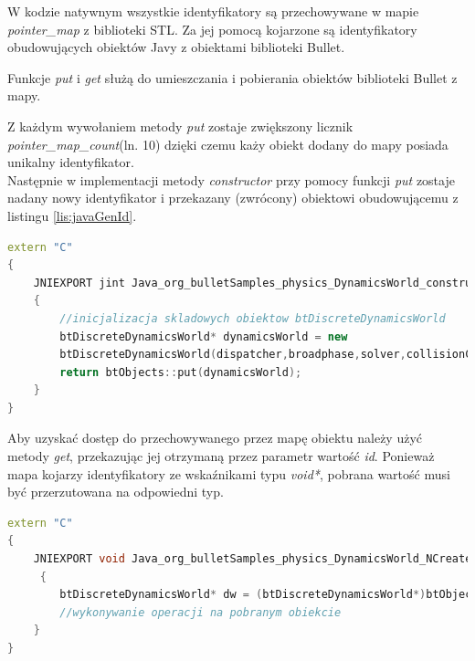 

W kodzie natywnym wszystkie identyfikatory są przechowywane w mapie
\emph{pointer\_map} z biblioteki STL. Za jej pomocą kojarzone są identyfikatory
obudowujących obiektów Javy z obiektami biblioteki Bullet.

\newpage


Funkcje \emph{put} i \emph{get} służą do umieszczania i pobierania obiektów
biblioteki Bullet z mapy.



Z każdym wywołaniem metody \emph{put} zostaje zwiększony licznik
\emph{pointer\_map\_count}(ln. 10) dzięki czemu każy obiekt dodany do mapy
posiada unikalny identyfikator.\\
Następnie w implementacji metody \emph{constructor} przy
pomocy funkcji \emph{put} zostaje nadany nowy identyfikator i
przekazany (zwrócony) obiektowi obudowującemu z listingu \ref{lis:javaGenId}.

\begin{lstlisting}[language=c++, caption=Użycie mapy pointer\_map w
funkcji constructor.]
extern "C"
{
	JNIEXPORT jint Java_org_bulletSamples_physics_DynamicsWorld_constructor( JNIEnv* env, jobject self )
	{
		//inicjalizacja skladowych obiektow btDiscreteDynamicsWorld
		btDiscreteDynamicsWorld* dynamicsWorld = new
		btDiscreteDynamicsWorld(dispatcher,broadphase,solver,collisionConfiguration);
		return btObjects::put(dynamicsWorld);
	}
}
\end{lstlisting}

Aby uzyskać dostęp do przechowywanego przez mapę obiektu należy użyć metody
\emph{get}, przekazując jej otrzymaną przez parametr wartość \emph{id}. Ponieważ
mapa kojarzy identyfikatory ze wskaźnikami typu \emph{void*}, pobrana wartość
musi być przerzutowana na odpowiedni typ.

\begin{lstlisting}[language=c++, caption=Pobranie przechowywanego obiektu z
mapy] extern "C"
{
	JNIEXPORT void Java_org_bulletSamples_physics_DynamicsWorld_NCreateBox( JNIEnv* env, jobject self, jint id ...) 
	 {
	 	btDiscreteDynamicsWorld* dw = (btDiscreteDynamicsWorld*)btObjects::get(id);
	 	//wykonywanie operacji na pobranym obiekcie
	}
}
\end{lstlisting}

